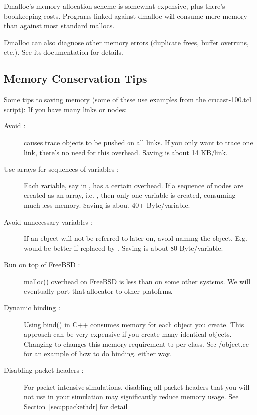 Dmalloc's memory allocation scheme is somewhat expensive, plus there's
bookkeeping costs. Programs linked against dmalloc will consume more
memory than against most standard mallocs. 

Dmalloc can also diagnose other memory errors (duplicate frees, buffer
overruns, etc.). See its documentation for details. 


\subsection{Memory Conservation Tips}
\label{sec:memconserve}

Some tips to saving memory (some of these use examples from the 
cmcast-100.tcl script): 
If you have many links or nodes: 
\begin{description}
\item[Avoid  :]
 causes trace objects to be pushed on all links. If 
you only want to trace one link, there's no need for this overhead. Saving
is about 14 KB/link. 

\item[Use arrays for sequences of variables :]
Each variable, say  in , has a certain
overhead. If a sequence of nodes are created as an array, i.e.
, then only one variable is created, consuming much less
memory. Saving is about 40+ Byte/variable. 

\item[Avoid unnecessary variables :]
If an object will not be referred to later on, avoid naming the object.
E.g.
would be better if replaced by
.
Saving is about 80 Byte/variable. 

\item[Run on top of FreeBSD :]
malloc() overhead on FreeBSD is less than on some other systems. We will
eventually port that allocator to other platofrms. 

\item[Dynamic binding :]
Using bind() in C++ consumes memory for each object you create. This
approach can be very expensive if you create many identical objects.
Changing  to  changes this memory
requirement to per-class. See \ns/object.cc for an example of how to do
binding, either way.

\item[Disabling packet headers :]
For packet-intensive simulations, disabling all packet headers that
you will not use in your simulation may significantly reduce memory
usage. See Section~\ref{sec:ppackethdr} for detail.
 
\end{description}


